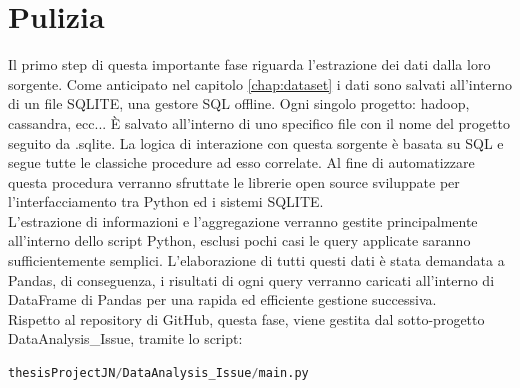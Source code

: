 \documentclass[%
    corpo=12pt,
    twoside,
    oldstyle,
    autoretitolo,
    greek,
    evenboxes,
]{toptesi}
\begin{document}
\section{Pulizia}
Il primo step di questa importante fase riguarda l'estrazione dei dati dalla loro sorgente. Come anticipato nel capitolo \ref{chap:dataset} i dati sono salvati all'interno di un file SQLITE, una gestore SQL offline. Ogni singolo progetto: hadoop, cassandra, ecc... È salvato all'interno di uno specifico file con il nome del progetto seguito da .sqlite. La logica di interazione con questa sorgente è basata su SQL e segue tutte le classiche procedure ad esso correlate. Al fine di automatizzare questa procedura verranno sfruttate le librerie open source sviluppate per l'interfacciamento tra Python ed i sistemi SQLITE.\\
L'estrazione di informazioni e l'aggregazione verranno gestite principalmente all'interno dello script Python, esclusi pochi casi le query applicate saranno sufficientemente semplici. L'elaborazione di tutti questi dati è stata demandata a Pandas, di conseguenza, i risultati di ogni query verranno caricati all'interno di DataFrame di Pandas per una rapida ed efficiente gestione successiva.\\
Rispetto al repository di GitHub, questa fase, viene gestita dal sotto-progetto DataAnalysis\_Issue, tramite lo script:
\begin{lstlisting}[language=Python, frame=single]
  thesisProjectJN/DataAnalysis_Issue/main.py
\end{lstlisting}
\end{document}
